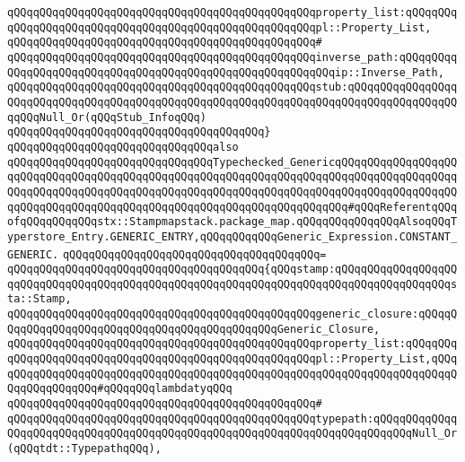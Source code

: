 \verb|qQQqqQQqqQQqqQQqqQQqqQQqqQQqqQQqqQQqqQQqqQQqqQQqproperty_list:qQQqqQQqqQQqqQQqqQQqqQQqqQQqqQQqqQQqqQQqqQQqqQQqqQQqqQQqpl::Property_List,|\newline
\verb|qQQqqQQqqQQqqQQqqQQqqQQqqQQqqQQqqQQqqQQqqQQqqQQq#|\newline
\verb|qQQqqQQqqQQqqQQqqQQqqQQqqQQqqQQqqQQqqQQqqQQqqQQqinverse_path:qQQqqQQqqQQqqQQqqQQqqQQqqQQqqQQqqQQqqQQqqQQqqQQqqQQqqQQqqQQqip::Inverse_Path,|\newline
\verb|qQQqqQQqqQQqqQQqqQQqqQQqqQQqqQQqqQQqqQQqqQQqqQQqstub:qQQqqQQqqQQqqQQqqQQqqQQqqQQqqQQqqQQqqQQqqQQqqQQqqQQqqQQqqQQqqQQqqQQqqQQqqQQqqQQqqQQqqQQqqQQqNull_Or(qQQqStub_InfoqQQq)|\newline
\verb|qQQqqQQqqQQqqQQqqQQqqQQqqQQqqQQqqQQqqQQq}|\newline
\newline
\newline
\newline
\verb|qQQqqQQqqQQqqQQqqQQqqQQqqQQqqQQqalso|\newline
\verb|qQQqqQQqqQQqqQQqqQQqqQQqqQQqqQQqTypechecked_GenericqQQqqQQqqQQqqQQqqQQqqQQqqQQqqQQqqQQqqQQqqQQqqQQqqQQqqQQqqQQqqQQqqQQqqQQqqQQqqQQqqQQqqQQqqQQqqQQqqQQqqQQqqQQqqQQqqQQqqQQqqQQqqQQqqQQqqQQqqQQqqQQqqQQqqQQqqQQqqQQqqQQqqQQqqQQqqQQqqQQqqQQqqQQqqQQqqQQqqQQqqQQqqQQqqQQq#qQQqReferentqQQqofqQQqqQQqqQQqstx::Stampmapstack.package_map.qQQqqQQqqQQqqQQqAlsoqQQqTyperstore_Entry.GENERIC_ENTRY,qQQqqQQqqQQqGeneric_Expression.CONSTANT_GENERIC.|\newline
\verb|qQQqqQQqqQQqqQQqqQQqqQQqqQQqqQQqqQQqqQQq=|\newline
\verb|qQQqqQQqqQQqqQQqqQQqqQQqqQQqqQQqqQQqqQQq{qQQqstamp:qQQqqQQqqQQqqQQqqQQqqQQqqQQqqQQqqQQqqQQqqQQqqQQqqQQqqQQqqQQqqQQqqQQqqQQqqQQqqQQqqQQqqQQqsta::Stamp,|\newline
\verb|qQQqqQQqqQQqqQQqqQQqqQQqqQQqqQQqqQQqqQQqqQQqqQQqgeneric_closure:qQQqqQQqqQQqqQQqqQQqqQQqqQQqqQQqqQQqqQQqqQQqqQQqGeneric_Closure,|\newline
\verb|qQQqqQQqqQQqqQQqqQQqqQQqqQQqqQQqqQQqqQQqqQQqqQQqproperty_list:qQQqqQQqqQQqqQQqqQQqqQQqqQQqqQQqqQQqqQQqqQQqqQQqqQQqqQQqpl::Property_List,qQQqqQQqqQQqqQQqqQQqqQQqqQQqqQQqqQQqqQQqqQQqqQQqqQQqqQQqqQQqqQQqqQQqqQQqqQQqqQQqqQQqqQQq#qQQqqQQqlambdatyqQQq|\newline
\verb|qQQqqQQqqQQqqQQqqQQqqQQqqQQqqQQqqQQqqQQqqQQqqQQq#|\newline
\verb|qQQqqQQqqQQqqQQqqQQqqQQqqQQqqQQqqQQqqQQqqQQqqQQqtypepath:qQQqqQQqqQQqqQQqqQQqqQQqqQQqqQQqqQQqqQQqqQQqqQQqqQQqqQQqqQQqqQQqqQQqqQQqqQQqNull_Or(qQQqtdt::TypepathqQQq),|\newline

